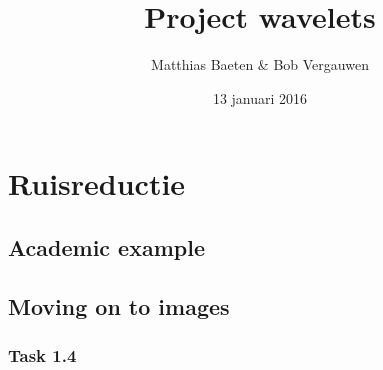 

\title{Project wavelets}
\author{Matthias Baeten \& Bob Vergauwen}
\date{ 13 januari 2016}



\maketitle

\section{Ruisreductie}

\subsection{Academic example}

\subsection{Moving on to images}

\subsubsection{Task 1.4}

